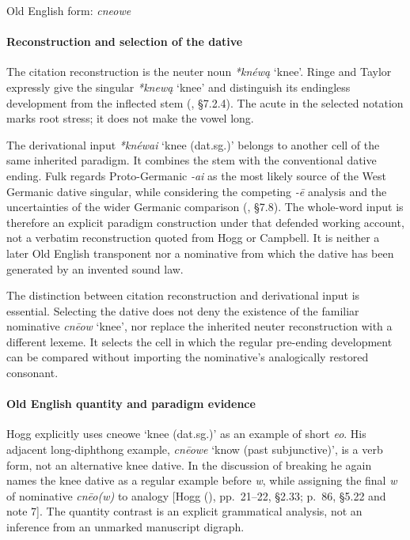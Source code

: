 \documentclass[
  british,
  a4paper,
]{article}
\providecommand{\Recon}[1]{\emph{*#1}}
\begin{document}
Old English form: \emph{cneowe}

\paragraph{Reconstruction and selection of the
dative}\label{reconstruction-and-selection-of-the-dative}

The citation reconstruction is the neuter noun \Recon{knéwą} `knee'.
Ringe and Taylor expressly give the singular \Recon{knewą} `knee' and
distinguish its endingless development from the inflected stem
(, §7.2.4).
The acute in the selected notation marks root stress; it does not make
the vowel long.

The derivational input \Recon{knéwai} `knee (dat.sg.)' belongs to
another cell of the same inherited paradigm. It combines the stem with
the conventional dative ending. Fulk regards Proto-Germanic \emph{-ai}
as the most likely source of the West Germanic dative singular, while
considering the competing \emph{-ē} analysis and the uncertainties of
the wider Germanic comparison (,
§7.8). The whole-word input is therefore an explicit paradigm
construction under that defended working account, not a verbatim
reconstruction quoted from Hogg or Campbell. It is neither a later Old
English transponent nor a nominative from which the dative has been
generated by an invented sound law.

The distinction between citation reconstruction and derivational input
is essential. Selecting the dative does not deny the existence of the
familiar nominative \emph{cnēow} `knee', nor replace the inherited
neuter reconstruction with a different lexeme. It selects the cell in
which the regular pre-ending development can be compared without
importing the nominative's analogically restored consonant.

\paragraph{Old English quantity and paradigm
evidence}\label{old-english-quantity-and-paradigm-evidence}

Hogg explicitly uses {cneowe} `knee (dat.sg.)' as an example of short
\emph{eo}. His adjacent long-diphthong example, \emph{cnēowe} `know
(past subjunctive)', is a verb form, not an alternative knee dative. In
the discussion of breaking he again names the knee dative as a regular
example before \emph{w}, while assigning the final \emph{w} of
nominative \emph{cnēo(w)} to analogy {[}Hogg
(), pp.~21--22, §2.33; p.~86, §5.22
and note 7{]}. The quantity contrast is an explicit grammatical
analysis, not an inference from an unmarked manuscript digraph.
\end{document}
